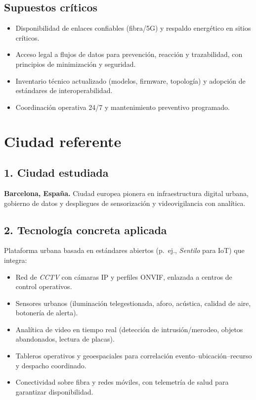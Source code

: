 \documentclass[12pt,a4paper]{article}
\begin{document}
\subsection*{Supuestos críticos}
\begin{itemize}
    \item Disponibilidad de enlaces confiables (fibra/5G) y respaldo energético en sitios críticos.
    \item Acceso legal a flujos de datos para prevención, reacción y trazabilidad, con principios de minimización y seguridad.
    \item Inventario técnico actualizado (modelos, firmware, topología) y adopción de estándares de interoperabilidad.
    \item Coordinación operativa 24/7 y mantenimiento preventivo programado.
\end{itemize}


\section{Ciudad referente}

\subsection*{1. Ciudad estudiada}
\textbf{Barcelona, España.} Ciudad europea pionera en infraestructura digital urbana, gobierno de datos y despliegues de sensorización y videovigilancia con analítica.

\subsection*{2. Tecnología concreta aplicada}
Plataforma urbana basada en estándares abiertos (p.~ej., \textit{Sentilo} para IoT) que integra:
\begin{itemize}
  \item Red de \textit{CCTV} con cámaras IP y perfiles ONVIF, enlazada a centros de control operativos.
  \item Sensores urbanos (iluminación telegestionada, aforo, acústica, calidad de aire, botonería de alerta).
  \item Analítica de video en tiempo real (detección de intrusión/merodeo, objetos abandonados, lectura de placas).
  \item Tableros operativos y geoespaciales para correlación evento--ubicación--recurso y despacho coordinado.
  \item Conectividad sobre fibra y redes móviles, con telemetría de salud para garantizar disponibilidad.
\end{itemize}
\end{document}
